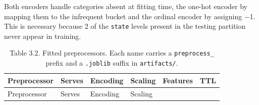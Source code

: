 \documentclass[
  canadian,
  12pt,
]{article}
\begin{document}
Both encoders handle categories absent at fitting time, the one-hot
encoder by mapping them to the infrequent bucket and the ordinal encoder
by assigning −1. This is necessary because 2 of the \texttt{state}
levels present in the testing partition never appear in training.

\begin{longtable}[]{@{}
  >{\raggedright\arraybackslash}p{}
  >{\raggedright\arraybackslash}p{}
  >{\raggedright\arraybackslash}p{}
  >{\raggedright\arraybackslash}p{}
  >{\raggedleft\arraybackslash}p{}
  >{\raggedright\arraybackslash}p{}@{}}
\caption[Table 3.2. Fitted preprocessors.]{Table 3.2. Fitted preprocessors. Each name carries a
\texttt{preprocess\_} prefix and a \texttt{.joblib} suffix in
\texttt{artifacts/}.}\tabularnewline
\toprule\noalign{}
\begin{minipage}[b]{\linewidth}\raggedright
Preprocessor
\end{minipage} & \begin{minipage}[b]{\linewidth}\raggedright
Serves
\end{minipage} & \begin{minipage}[b]{\linewidth}\raggedright
Encoding
\end{minipage} & \begin{minipage}[b]{\linewidth}\raggedright
Scaling
\end{minipage} & \begin{minipage}[b]{\linewidth}\raggedleft
Features
\end{minipage} & \begin{minipage}[b]{\linewidth}\raggedright
TTL
\end{minipage} \\
\midrule\noalign{}
\endfirsthead
\toprule\noalign{}
\begin{minipage}[b]{\linewidth}\raggedright
Preprocessor
\end{minipage} & \begin{minipage}[b]{\linewidth}\raggedright
Serves
\end{minipage} & \begin{minipage}[b]{\linewidth}\raggedright
Encoding
\end{minipage} & \begin{minipage}[b]{\linewidth}\raggedright
Scaling

\end{minipage}
\end{longtable}
\end{document}
